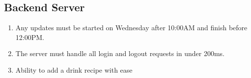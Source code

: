 {	\subsection{Backend Server}
	\begin{enumerate}
		\item Any updates must be started on Wednesday after 10:00AM and finish before 12:00PM.
		\item The server must handle all login and logout requests in under 200ms.
   		\item Ability to add a drink recipe with ease
	\end{enumerate}
    
    }
    


